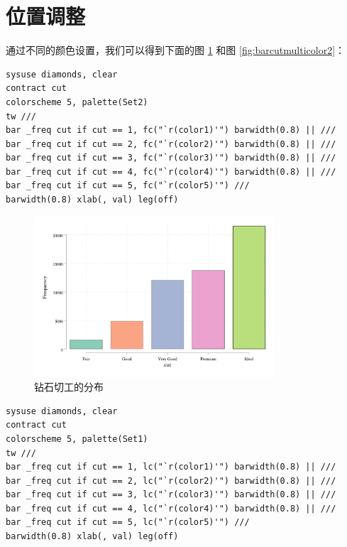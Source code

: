 \documentclass[]{ctexbook}
\begin{document}
\hypertarget{section-35}{%
\section{位置调整}\label{section-35}}

通过不同的颜色设置，我们可以得到下面的图 \ref{fig:barcutmulticolor} 和图 \ref{fig:barcutmulticolor2}：

\begin{lstlisting}
sysuse diamonds, clear
contract cut
colorscheme 5, palette(Set2)
tw ///
bar _freq cut if cut == 1, fc("`r(color1)'") barwidth(0.8) || ///
bar _freq cut if cut == 2, fc("`r(color2)'") barwidth(0.8) || ///
bar _freq cut if cut == 3, fc("`r(color3)'") barwidth(0.8) || ///
bar _freq cut if cut == 4, fc("`r(color4)'") barwidth(0.8) || ///
bar _freq cut if cut == 5, fc("`r(color5)'") ///
barwidth(0.8) xlab(, val) leg(off)
\end{lstlisting}

\begin{figure}

{\centering \includegraphics[width=0.8\textwidth]{assets/barcutmulticolor} 

}

\caption{钻石切工的分布}\label{fig:barcutmulticolor}
\end{figure}

\begin{lstlisting}
sysuse diamonds, clear
contract cut
colorscheme 5, palette(Set1)
tw ///
bar _freq cut if cut == 1, lc("`r(color1)'") barwidth(0.8) || ///
bar _freq cut if cut == 2, lc("`r(color2)'") barwidth(0.8) || ///
bar _freq cut if cut == 3, lc("`r(color3)'") barwidth(0.8) || ///
bar _freq cut if cut == 4, lc("`r(color4)'") barwidth(0.8) || ///
bar _freq cut if cut == 5, lc("`r(color5)'") ///
barwidth(0.8) xlab(, val) leg(off)
\end{lstlisting}
\end{document}
